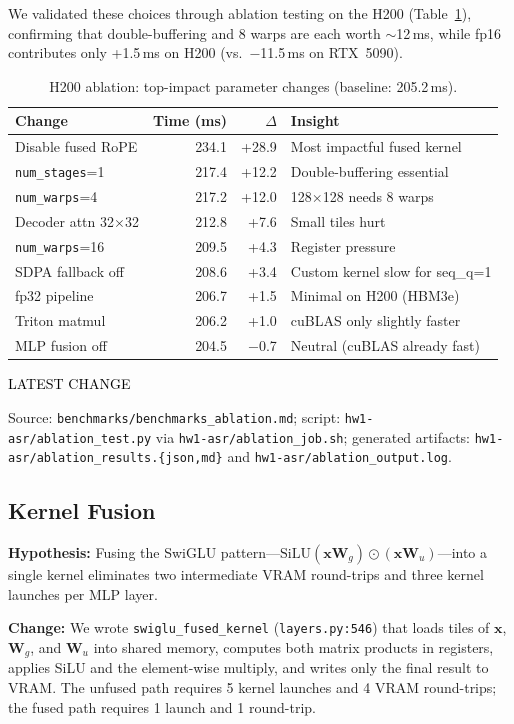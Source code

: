 \documentclass{article}
\newcommand{\latestchglabel}{{\setlength{\fboxsep}{1pt}\colorbox{yellow!65}{\textcolor{black}{\scriptsize LATEST CHANGE}}}}
\newcommand{\latestsource}[1]{%
  \par\noindent
  {\footnotesize \latestchglabel\ \parbox[t]{0.9\linewidth}{#1}}\par
}
\begin{document}
We validated these choices through ablation testing on the H200 (Table~\ref{tab:ablation}), confirming that double-buffering and 8 warps are each worth $\sim$12\,ms, while fp16 contributes only +1.5\,ms on H200 (vs.\ $-$11.5\,ms on RTX~5090).

\begin{table}[h]
\centering
\caption{H200 ablation: top-impact parameter changes (baseline: 205.2\,ms).}
\label{tab:ablation}
\small
\begin{tabular}{@{}lrrl@{}}
\toprule
\textbf{Change} & \textbf{Time (ms)} & \textbf{$\Delta$} & \textbf{Insight} \\
\midrule
Disable fused RoPE & 234.1 & +28.9 & Most impactful fused kernel \\
\texttt{num\_stages}=1 & 217.4 & +12.2 & Double-buffering essential \\
\texttt{num\_warps}=4 & 217.2 & +12.0 & 128$\times$128 needs 8 warps \\
Decoder attn 32$\times$32 & 212.8 & +7.6 & Small tiles hurt \\
\texttt{num\_warps}=16 & 209.5 & +4.3 & Register pressure \\
SDPA fallback off & 208.6 & +3.4 & Custom kernel slow for seq\_q=1 \\
fp32 pipeline & 206.7 & +1.5 & Minimal on H200 (HBM3e) \\
Triton matmul & 206.2 & +1.0 & cuBLAS only slightly faster \\
MLP fusion off & 204.5 & $-$0.7 & Neutral (cuBLAS already fast) \\
\bottomrule
\end{tabular}
\end{table}

\latestsource{Source: \texttt{benchmarks/benchmarks\_ablation.md}; script: \texttt{hw1-asr/ablation\_test.py} via \texttt{hw1-asr/ablation\_job.sh}; generated artifacts: \texttt{hw1-asr/ablation\_results.\{json,md\}} and \texttt{hw1-asr/ablation\_output.log}.}

\subsection{Kernel Fusion}\label{sec:fusion}

\textbf{Hypothesis:} Fusing the SwiGLU pattern---$\text{SiLU}(\mathbf{x} \mathbf{W}_g) \odot (\mathbf{x} \mathbf{W}_u)$---into a single kernel eliminates two intermediate VRAM round-trips and three kernel launches per MLP layer.

\textbf{Change:} We wrote \texttt{swiglu\_fused\_kernel} (\texttt{layers.py:546}) that loads tiles of $\mathbf{x}$, $\mathbf{W}_g$, and $\mathbf{W}_u$ into shared memory, computes both matrix products in registers, applies SiLU and the element-wise multiply, and writes only the final result to VRAM.  The unfused path requires 5 kernel launches and 4 VRAM round-trips; the fused path requires 1 launch and 1 round-trip.
\end{document}
